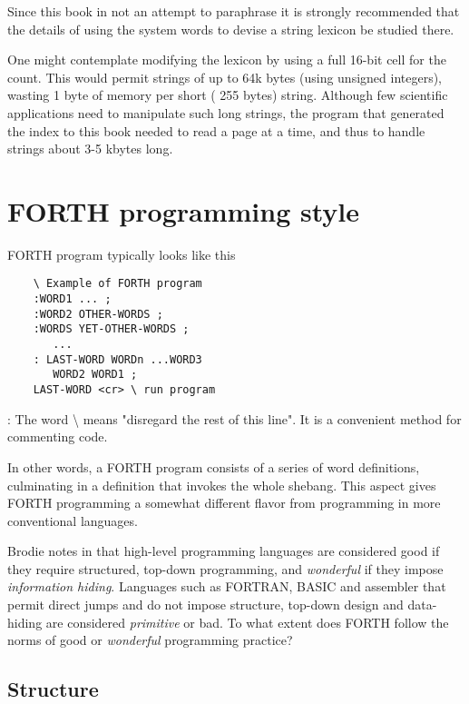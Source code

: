 Since this book in not an attempt to paraphrase \FTR it is strongly recommended that the details of using the system words to devise a string lexicon be studied there.

\leftbar[1\linewidth]
One might contemplate modifying the \FTR lexicon by using a full 16-bit cell for the count. This would permit strings of up to 64k bytes (using unsigned integers\footnotemark), wasting 1 byte of memory per short ( 255 bytes) string. Although few scientific applications need to manipulate such long strings, the program that generated the index to this book needed to read a page at a time, and thus to handle strings about 3-5 kbytes long.
\endleftbar
{}

\section{FORTH programming style}

 FORTH program typically looks like this
\begin{lstlisting}
    \ Example of FORTH program
    :WORD1 ... ;
    :WORD2 OTHER-WORDS ;
    :WORDS YET-OTHER-WORDS ;
       ...
    : LAST-WORD WORDn ...WORD3
       WORD2 WORD1 ;
    LAST-WORD <cr> \ run program
\end{lstlisting}

\leftbar[1\linewidth]
\Note: The word {\textbackslash } means "disregard the rest of this line". It is a convenient method for commenting code.
\endleftbar

In other words, a FORTH program consists of a series of word definitions, culminating in a definition that invokes the whole shebang. This aspect gives FORTH programming a somewhat different flavor from programming in more conventional languages.

Brodie notes in \TF that high-level programming languages are considered good if they require structured, top-down programming, and \textit{wonderful} if they impose \textit{information hiding}. Languages such as FORTRAN, BASIC and assembler that permit direct jumps and do not impose structure, top-down design and data-hiding are considered \textit{primitive} or bad. To what extent does FORTH follow the norms of good or \textit{wonderful} programming practice?

\subsection{Structure}

